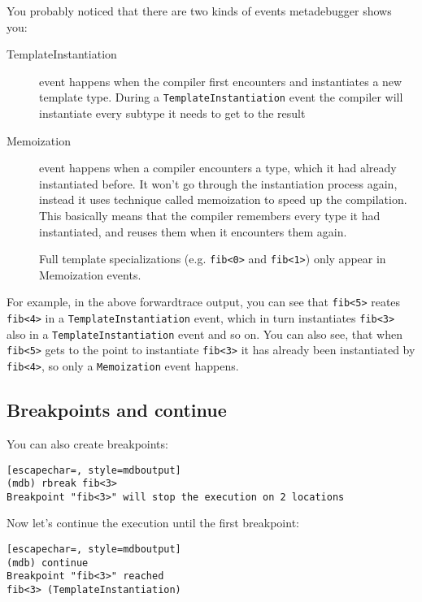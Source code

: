 You probably noticed that there are two kinds of events metadebugger shows you:

\begin{description}
    \item[TemplateInstantiation] event happens when the compiler first
        encounters and instantiates a new template type. During a
        \texttt{TemplateInstantiation} event the compiler will instantiate
        every subtype it needs to get to the result
    \item[Memoization] event happens when a compiler encounters a type, which
        it had already instantiated before. It won't go through the
        instantiation process again, instead it uses technique called
        memoization to speed up the compilation. This basically means that the
        compiler remembers every type it had instantiated, and reuses them when
        it encounters them again.

        Full template specializations (e.g. \texttt{fib<0>} and
        \texttt{fib<1>}) only appear in Memoization events.
\end{description}

For example, in the above forwardtrace output, you can see that \texttt{fib<5>}
reates \texttt{fib<4>} in a \texttt{TemplateInstantiation} event, which in turn
instantiates \texttt{fib<3>} also in a \texttt{TemplateInstantiation} event and
so on.  You can also see, that when \texttt{fib<5>} gets to the point to
instantiate \texttt{fib<3>} it has already been instantiated by
\texttt{fib<4>}, so only a \texttt{Memoization} event happens.

\subsection{Breakpoints and continue}

You can also create breakpoints:

\begin{minipage}{\linewidth}
\begin{lstlisting}[escapechar=, style=mdboutput]
(mdb) rbreak fib<3>
Breakpoint "fib<3>" will stop the execution on 2 locations
\end{lstlisting}
\end{minipage}

Now let's continue the execution until the first breakpoint:

\begin{minipage}{\linewidth}
\begin{lstlisting}[escapechar=, style=mdboutput]
(mdb) continue
Breakpoint "fib<3>" reached
fib<3> (TemplateInstantiation)
\end{lstlisting}
\end{minipage}

